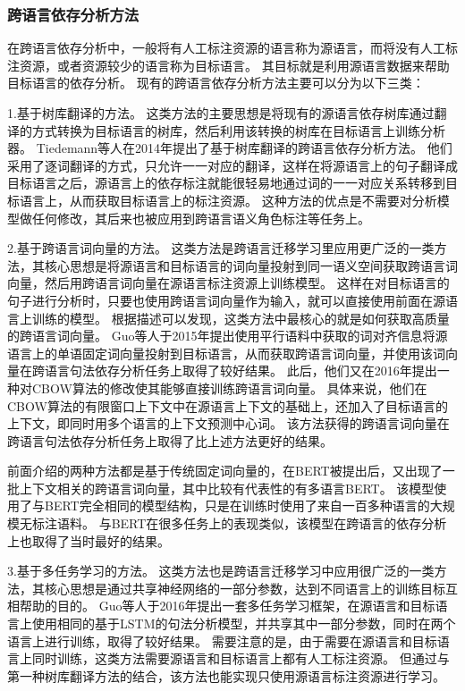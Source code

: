\subsubsection{跨语言依存分析方法}

在跨语言依存分析中，一般将有人工标注资源的语言称为源语言，而将没有人工标注资源，或者资源较少的语言称为目标语言。
其目标就是利用源语言数据来帮助目标语言的依存分析。
现有的跨语言依存分析方法主要可以分为以下三类：

1.基于树库翻译的方法。
这类方法的主要思想是将现有的源语言依存树库通过翻译的方式转换为目标语言的树库，然后利用该转换的树库在目标语言上训练分析器。
Tiedemann等人在2014年提出了基于树库翻译的跨语言依存分析方法\cite{tiedemann-etal-2014-treebank}。
他们采用了逐词翻译的方式，只允许一一对应的翻译，这样在将源语言上的句子翻译成目标语言之后，源语言上的依存标注就能很轻易地通过词的一一对应关系转移到目标语言上，从而获取目标语言上的标注资源。
这种方法的优点是不需要对分析模型做任何修改，其后来也被应用到跨语言语义角色标注等任务上\cite{fei-etal-2020-cross}。


2.基于跨语言词向量的方法。
这类方法是跨语言迁移学习里应用更广泛的一类方法，其核心思想是将源语言和目标语言的词向量投射到同一语义空间获取跨语言词向量，然后用跨语言词向量在源语言标注资源上训练模型。
这样在对目标语言的句子进行分析时，只要也使用跨语言词向量作为输入，就可以直接使用前面在源语言上训练的模型。
根据描述可以发现，这类方法中最核心的就是如何获取高质量的跨语言词向量。
Guo等人\cite{guo-etal-2015-cross}于2015年提出使用平行语料中获取的词对齐信息将源语言上的单语固定词向量投射到目标语言，从而获取跨语言词向量，并使用该词向量在跨语言句法依存分析任务上取得了较好结果。
此后，他们又在2016年提出一种对CBOW算法的修改使其能够直接训练跨语言词向量\cite{guo-etal-2016-representation}。
具体来说，他们在CBOW算法的有限窗口上下文中在源语言上下文的基础上，还加入了目标语言的上下文，即同时用多个语言的上下文预测中心词。
该方法获得的跨语言词向量在跨语言句法依存分析任务上取得了比上述方法更好的结果。

前面介绍的两种方法都是基于传统固定词向量的，在BERT被提出后，又出现了一批上下文相关的跨语言词向量\cite{conneau-etal-2019-cross,conneau-etal-2020-unsupervised}，其中比较有代表性的有多语言BERT。
该模型使用了与BERT完全相同的模型结构，只是在训练时使用了来自一百多种语言的大规模无标注语料。
与BERT在很多任务上的表现类似，该模型在跨语言的依存分析上也取得了当时最好的结果\cite{kondratyuk-etal-2019-languages}。

3.基于多任务学习的方法。
这类方法也是跨语言迁移学习中应用很广泛的一类方法，其核心思想是通过共享神经网络的一部分参数，达到不同语言上的训练目标互相帮助的目的。
Guo等人\cite{guo-etal-2016-universal}于2016年提出一套多任务学习框架，在源语言和目标语言上使用相同的基于LSTM的句法分析模型，并共享其中一部分参数，同时在两个语言上进行训练，取得了较好结果。
需要注意的是，由于需要在源语言和目标语言上同时训练，这类方法需要源语言和目标语言上都有人工标注资源。
但通过与第一种树库翻译方法的结合，该方法也能实现只使用源语言标注资源进行学习。

